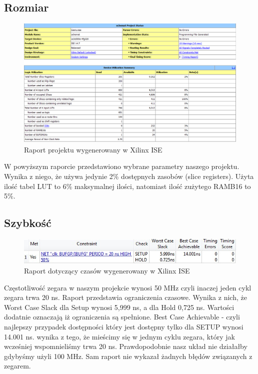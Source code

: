 \documentclass[a4paper]{article}
\begin{document}
\subsection{Rozmiar}
\begin{figure}[H]
  \caption{Raport projektu wygenerowany w Xilinx ISE}
  \includegraphics[scale=0.5]{statusProj}
  \centering
\end{figure}
W powyższym raporcie przedstawiono wybrane parametry naszego projektu. Wynika z niego, że używa jedynie 2\% dostępnych zasobów (slice registers). Użyta ilość tabel LUT to 6\% maksymalnej ilości, natomiast ilość zużytego RAMB16 to 5\%.

\subsection{Szybkość}

\begin{figure}[H]
  \caption{ Raport dotyczący czasów wygenerowany w Xilinx ISE }
  \includegraphics[scale=0.8]{memory}
  \centering
\end{figure}

Częstotliwość zegara w naszym projekcie wynosi 50 MHz czyli inaczej jeden cykl zegara trwa 20 ns. Raport przedstawia ograniczenia czasowe. Wynika z nich, że Worst Case Slack dla Setup wynosi 5,999 ns, a dla Hold 0,725 ns. Wartości dodatnie oznaczają iż ograniczenia są spełnione. Best Case Achievable - czyli najlepszy przypadek dostępności który jest dostępny tylko dla SETUP wynosi 14.001 ns. wynika z tego, że mieścimy się w jednym cyklu zegara, który jak wcześniej wspomnieliśmy trwa 20 ns. Prawdopodobnie nasz układ nie działałby gdybyśmy użyli 100 MHz. Sam raport nie wykazał żadnych błędów związanych z zegarem.
\end{document}
